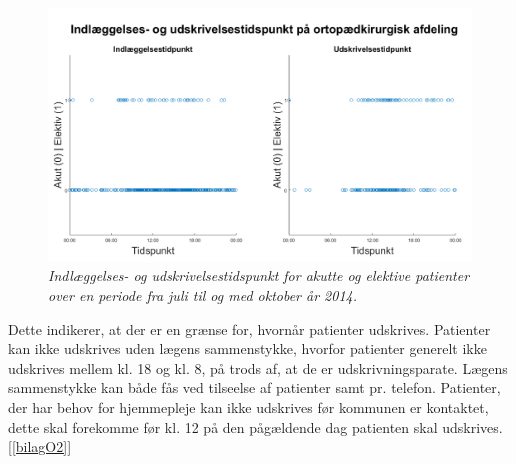 \begin{figure}[H]
	\centering
	\includegraphics[scale=0.5]{figures/indlaegudskriv.png}
	\caption{\textit{Indlæggelses- og udskrivelsestidspunkt for akutte og elektive patienter over en periode fra juli til og med oktober år 2014.}\cite{REOS}}
	\label{indlaegudskriv}
	\end{figure}
	
\noindent
Dette indikerer, at der er en grænse for, hvornår patienter udskrives. Patienter kan ikke udskrives uden lægens sammenstykke, hvorfor patienter generelt ikke udskrives mellem kl. 18 og kl. 8, på trods af, at de er udskrivningsparate. Lægens sammenstykke kan både fås ved tilseelse af patienter samt pr. telefon. Patienter, der har behov for hjemmepleje kan ikke udskrives før kommunen er kontaktet, dette skal forekomme før kl. 12 på den pågældende dag patienten skal udskrives.[\ref{bilagO2}]


